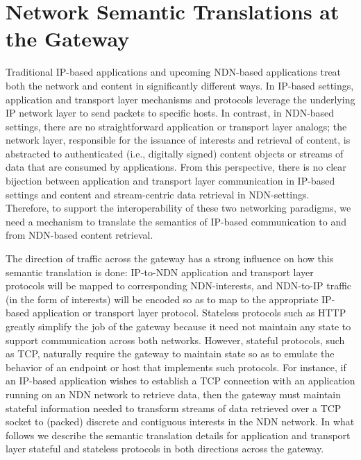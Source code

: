 \section{Network Semantic Translations at the Gateway}
Traditional IP-based applications and upcoming NDN-based applications treat both the network and content in significantly different ways. In IP-based settings, application and transport layer mechanisms and protocols leverage the underlying IP network layer to send packets to specific hosts. In contrast, in NDN-based settings, there are no straightforward application or transport layer analogs; the network layer, responsible for the issuance of interests and retrieval of content, is abstracted to authenticated (i.e., digitally signed) content objects or streams of data that are consumed by applications. From this perspective, there is no clear bijection between application and transport layer communication in IP-based settings and content and stream-centric data retrieval in NDN-settings. Therefore, to support the interoperability of these two networking paradigms, we need a mechanism to translate the semantics of IP-based communication to and from NDN-based content retrieval. 

The direction of traffic across the gateway has a strong influence on how this semantic translation is done: IP-to-NDN application and transport layer protocols will be mapped to corresponding NDN-interests, and NDN-to-IP traffic (in the form of interests) will be encoded so as to map to the appropriate IP-based application or transport layer protocol. Stateless protocols such as HTTP greatly simplify the job of the gateway because it need not maintain any state to support communication across both networks. However, stateful protocols, such as TCP, naturally require the gateway to maintain state so as to emulate the behavior of an endpoint or host that implements such protocols. For instance, if an IP-based application wishes to establish a TCP connection with an application running on an NDN network to retrieve data, then the gateway must maintain stateful information needed to transform streams of data retrieved over a TCP socket to (packed) discrete and contiguous interests in the NDN network. In what follows we describe the semantic translation details for application and transport layer stateful and stateless protocols in both directions across the gateway. 

